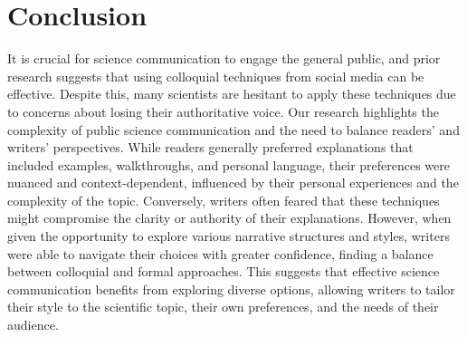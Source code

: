 \section{Conclusion}
It is crucial for science communication to engage the general public, and prior research suggests that using colloquial techniques from social media can be effective. Despite this, many scientists are hesitant to apply these techniques due to concerns about losing their authoritative voice. Our research highlights the complexity of public science communication and the need to balance readers’ and writers’ perspectives. While readers generally preferred explanations that included examples, walkthroughs, and personal language, their preferences were nuanced and context-dependent, influenced by their personal experiences and the complexity of the topic. Conversely, writers often feared that these techniques might compromise the clarity or authority of their explanations. However, when given the opportunity to explore various narrative structures and styles, writers were able to navigate their choices with greater confidence, finding a balance between colloquial and formal approaches. This suggests that effective science communication benefits from exploring diverse options, allowing writers to tailor their style to the scientific topic, their own preferences, and the needs of their audience.





